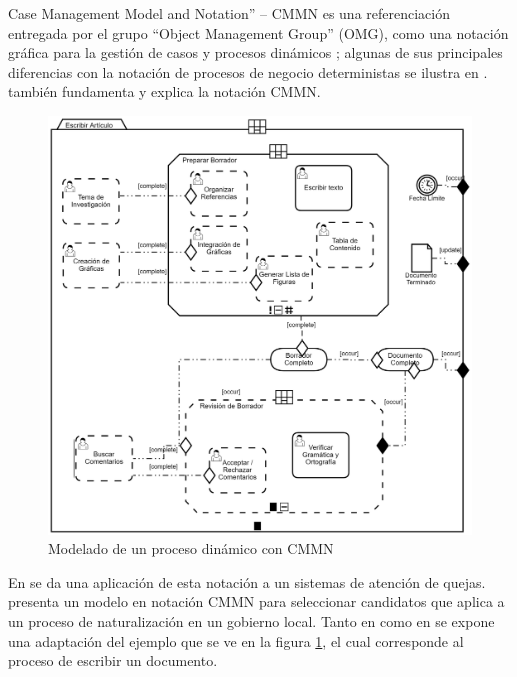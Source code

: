 Case Management Model and Notation” – CMMN es una referenciación entregada por el grupo “Object Management Group” (OMG), como una notación gráfica para la gestión de casos y procesos dinámicos \citep{hauder2014research}; algunas de sus principales diferencias con la notación de procesos de negocio deterministas se ilustra en \citet{breitenmoser2015case}. \citet{auer2014business} también fundamenta y explica la notación CMMN.

\begin{figure}[h]
  \centering
    \includegraphics[scale=0.25]{ModeloCMM.png}
  \caption[Modelado de un proceso dinámico]{Modelado de un proceso dinámico con CMMN}
  \label{EjCMMN}
\end{figure}

En \citet{marin2016introduction} se da una aplicación de esta notación a un sistemas de atención de quejas. \citet{breitenmoser2015case} presenta un modelo en notación CMMN para seleccionar candidatos que aplica a un proceso de naturalización en un gobierno local. Tanto en \citet{auer2014business}  como en \citet{omg2011business} se expone una adaptación del ejemplo que se ve en la figura \ref{EjCMMN}, el cual corresponde al proceso de escribir un documento.



